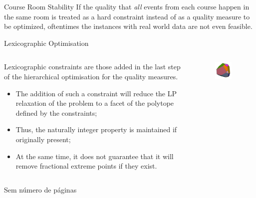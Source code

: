 \documentclass{beamer}
\begin{document}
\begin{frame}{Course Room Stability}
    If the quality that \emph{all} events from each course happen in the same room is treated as a hard constraint instead of as a quality measure to be optimized, oftentimes the instances with real world data are not even feasible.
\end{frame}

\begin{frame}{Lexicographic Optimisation}
  \begin{columns}[c]
      \begin{column}{.66\textwidth}
	Lexicographic constraints are those added in the last step of the hierarchical optimisation for the quality measures. 
	\begin{itemize}
	    \item The addition of such a constraint will reduce the LP relaxation of the problem to a facet of the polytope defined by the constraints;
	    \item Thus, the naturally integer property is maintained if originally present;
	    \item At the same time, it does not guarantee that it will remove fractional extreme points if they exist.
	\end{itemize}
      \end{column}
      \begin{column}{.33\textwidth}
	  \begin{figure}[h]
	      \centering
	      \includegraphics[width=0.8\textwidth]{polytope.png}
	  \end{figure}
      \end{column}
  \end{columns}
\end{frame}
\begin{frame}[plain]{Sem número de páginas}
\lipsum[1]
\end{frame}
\end{document}
